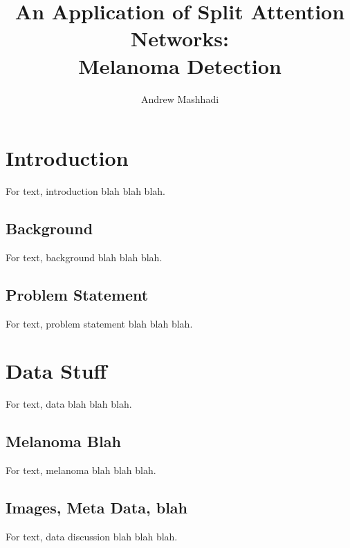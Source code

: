 \documentclass [MAS] {uclathes}
\title          {An Application of Split Attention Networks:\\
                Melanoma Detection}
\author         {Andrew Mashhadi}
\begin{document}
\makeintropages

\chapter{Introduction}

For text, introduction blah blah blah.

\section{Background}

For text, background blah blah blah.

\section{Problem Statement}

For text, problem statement blah blah blah.

\chapter{Data Stuff}

For text, data blah blah blah.

\section{Melanoma Blah}

For text, melanoma blah blah blah.

\section{Images, Meta Data, blah}

For text, data discussion blah blah blah. 
\cite{texbook}



\end{document}
